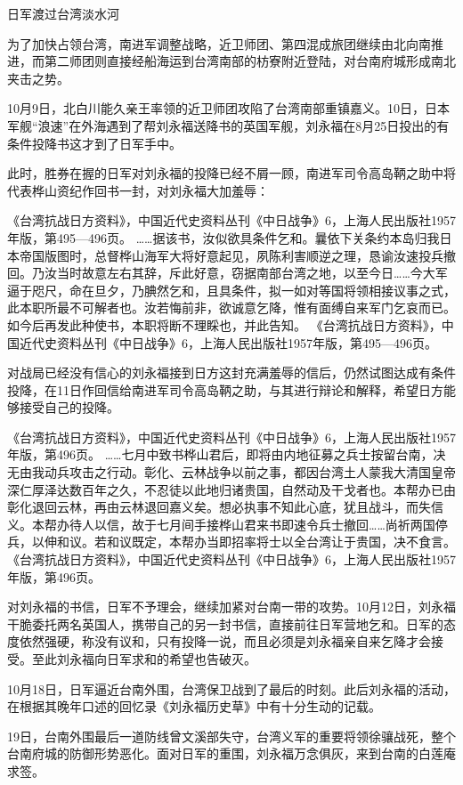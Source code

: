 \documentclass[12pt,UTF8]{ctexbook}
\begin{document}
日军渡过台湾淡水河

为了加快占领台湾，南进军调整战略，近卫师团、第四混成旅团继续由北向南推进，而第二师团则直接经船海运到台湾南部的枋寮附近登陆，对台南府城形成南北夹击之势。

10月9日，北白川能久亲王率领的近卫师团攻陷了台湾南部重镇嘉义。10日，日本军舰“浪速”在外海遇到了帮刘永福送降书的英国军舰，刘永福在8月25日投出的有条件投降书这才到了日军手中。

此时，胜券在握的日军对刘永福的投降已经不屑一顾，南进军司令高岛鞆之助中将代表桦山资纪作回书一封，对刘永福大加羞辱：

《台湾抗战日方资料》，中国近代史资料丛刊《中日战争》6，上海人民出版社1957年版，第495—496页。
……据该书，汝似欲具条件乞和。曩依下关条约本岛归我日本帝国版图时，总督桦山海军大将好意起见，夙陈利害顺逆之理，恳谕汝速投兵撤回。乃汝当时故意左右其辞，斥此好意，窃据南部台湾之地，以至今日……今大军逼于咫尺，命在旦夕，乃腆然乞和，且具条件，拟一如对等国将领相接议事之式，此本职所最不可解者也。汝若悔前非，欲诚意乞降，惟有面缚自来军门乞哀而已。如今后再发此种使书，本职将断不理睬也，并此告知。 《台湾抗战日方资料》，中国近代史资料丛刊《中日战争》6，上海人民出版社1957年版，第495—496页。

对战局已经没有信心的刘永福接到日方这封充满羞辱的信后，仍然试图达成有条件投降，在11日作回信给南进军司令高岛鞆之助，与其进行辩论和解释，希望日方能够接受自己的投降。

《台湾抗战日方资料》，中国近代史资料丛刊《中日战争》6，上海人民出版社1957年版，第496页。
……七月中致书桦山君后，即将由内地征募之兵士按留台南，决无由我动兵攻击之行动。彰化、云林战争以前之事，都因台湾土人蒙我大清国皇帝深仁厚泽达数百年之久，不忍徒以此地归诸贵国，自然动及干戈者也。本帮办已由彰化退回云林，再由云林退回嘉义矣。想必执事不知此心底，犹且战斗，而失信义。本帮办待人以信，故于七月间手接桦山君来书即速令兵士撤回……尚祈两国停兵，以伸和议。若和议既定，本帮办当即招率将士以全台湾让于贵国，决不食言。 《台湾抗战日方资料》，中国近代史资料丛刊《中日战争》6，上海人民出版社1957年版，第496页。

对刘永福的书信，日军不予理会，继续加紧对台南一带的攻势。10月12日，刘永福干脆委托两名英国人，携带自己的另一封书信，直接前往日军营地乞和。日军的态度依然强硬，称没有议和，只有投降一说，而且必须是刘永福亲自来乞降才会接受。至此刘永福向日军求和的希望也告破灭。

10月18日，日军逼近台南外围，台湾保卫战到了最后的时刻。此后刘永福的活动，在根据其晚年口述的回忆录《刘永福历史草》中有十分生动的记载。

19日，台南外围最后一道防线曾文溪部失守，台湾义军的重要将领徐骧战死，整个台南府城的防御形势恶化。面对日军的重围，刘永福万念俱灰，来到台南的白莲庵求签。
\end{document}
